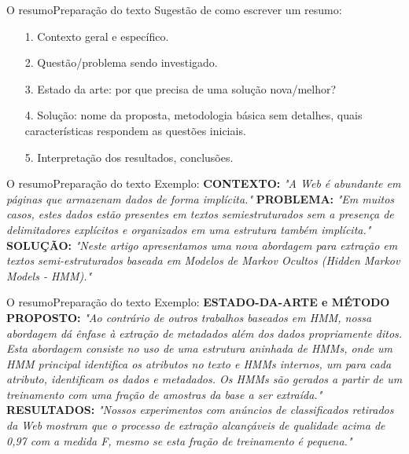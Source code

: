 \documentclass[t]{beamer}
\begin{document}

\begin{ftst}{O resumo}{Preparação do texto}
\justifying
Sugestão de como escrever um resumo:
\vone
\begin{itemize}
    \item[1. ] Contexto geral e específico.
    \item[2. ] Questão/problema sendo investigado.
    \item[3. ] Estado da arte: por que precisa de uma solução nova/melhor?
    \item[4. ] Solução: nome da proposta, metodologia básica sem detalhes, quais características respondem as questões iniciais.
    \item[5. ] Interpretação dos resultados, conclusões.
\end{itemize}


\end{ftst}


\begin{ftst}{O resumo}{Preparação do texto}
\justifying
Exemplo:
\vone
\small
\textbf{CONTEXTO:} \textit{"A Web é abundante em páginas que armazenam dados de forma implícita."}
\vone
\textbf{PROBLEMA:} \textit{"Em muitos casos, estes dados estão presentes em textos semiestruturados sem a presença de delimitadores explícitos e organizados em uma estrutura também implícita."}
\vone
\textbf{SOLUÇÃO:} \textit{"Neste artigo apresentamos uma nova abordagem para extração em textos semi-estruturados baseada em Modelos de Markov Ocultos (Hidden Markov Models - HMM)."}



\end{ftst}


\begin{ftst}{O resumo}{Preparação do texto}
\justifying
Exemplo:
\vone
\small
\textbf{ESTADO-DA-ARTE e MÉTODO PROPOSTO:} \textit{"Ao contrário de outros trabalhos baseados em HMM, nossa abordagem dá ênfase à extração de metadados além dos dados propriamente ditos. Esta abordagem consiste no uso de uma estrutura aninhada de HMMs, onde um HMM principal identifica os atributos no texto e HMMs internos, um para cada atributo, identificam os dados e metadados. Os HMMs são gerados a partir de um treinamento com uma fração de amostras da base a ser extraída."}
\vone
\textbf{RESULTADOS:} \textit{"Nossos experimentos com anúncios de
classificados retirados da Web mostram que o processo de
extração alcançáveis de qualidade acima de 0,97 com a medida F,
mesmo se esta fração de treinamento é pequena."}

\end{ftst}
\end{document}
